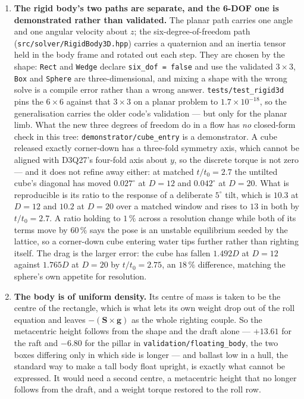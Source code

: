 \documentclass[11pt,a4paper]{article}
\newcommand{\code}[1]{\texttt{\small #1}}
\begin{document}
\begin{enumerate}[leftmargin=1.4em,itemsep=4pt]
\item \textbf{The rigid body's two paths are separate, and the 6-DOF one is
  demonstrated rather than validated.} The planar path carries one angle and one
  angular velocity about $z$; the six-degree-of-freedom path
  (\code{src/solver/RigidBody3D.hpp}) carries a quaternion and an inertia tensor
  held in the body frame and rotated out each step. They are chosen by the
  shape: \code{Rect} and \code{Wedge} declare \code{six\_dof = false} and use the
  validated $3\times3$, \code{Box} and \code{Sphere} are three-dimensional, and
  mixing a shape with the wrong solve is a compile error rather than a wrong
  answer. \code{tests/test\_rigid3d} pins the $6\times6$ against that $3\times3$
  on a planar problem to $1.7\times10^{-18}$, so the generalisation carries the
  older code's validation --- but only for the planar limb. What the new three
  degrees of freedom do in a flow has \emph{no} closed-form check in this tree:
  \code{demonstrator/cube\_entry} is a demonstrator. A cube released exactly
  corner-down has a three-fold symmetry axis, which cannot be aligned with
  D3Q27's four-fold axis about $y$, so the discrete torque is not zero --- and
  it does not refine away either: at matched $t/t_0=2.7$ the untilted cube's
  diagonal has moved $0.027^\circ$ at $D=12$ and $0.042^\circ$ at $D=20$. What
  is reproducible is its ratio to the response of a deliberate $5^\circ$ tilt,
  which is $10.3$ at $D=12$ and $10.2$ at $D=20$ over a matched window and rises
  to $13$ in both by $t/t_0=2.7$. A ratio holding to $1\,\%$ across a resolution
  change while both of its terms move by $60\,\%$ says the pose is an unstable
  equilibrium seeded by the lattice, so a corner-down cube entering water tips
  further rather than righting itself. The drag is the larger error: the cube has
  fallen $1.492D$ at $D=12$ against $1.765D$ at $D=20$ by $t/t_0=2.75$, an
  $18\,\%$ difference, matching the sphere's own appetite for resolution.

\item \textbf{The body is of uniform density.} Its centre of mass is taken to be
  the centre of the rectangle, which is what lets its own weight drop out of the
  roll equation and leaves $-(\bm S\times\bm g)$ as the whole righting couple. So
  the metacentric height follows from the shape and the draft alone ---
  $+13.61$ for the raft and $-6.80$ for the pillar in
  \code{validation/floating\_body}, the two boxes differing only in which side is
  longer --- and ballast low in a hull, the standard way to make a tall body
  float upright, is exactly what cannot be expressed. It would need a second
  centre, a metacentric height that no longer follows from the draft, and a
  weight torque restored to the roll row.


\end{enumerate}
\end{document}
